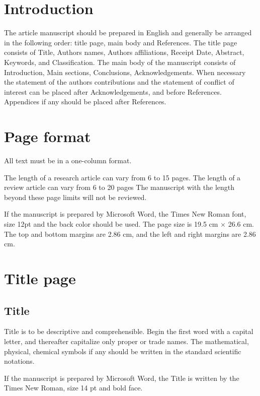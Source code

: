 \documentclass[a4,11pt]{cip-v3-cls-submit}
\begin{document}


\section{Introduction}

The article manuscript should be prepared in English and generally be arranged in the  following order:  title  page, main body and References.  The title page consists of Title, Authors names, Authors affiliations, Receipt Date, Abstract, Keywords, and Classification. The main body of the manuscript consists of Introduction, Main sections, Conclusions, Acknowledgements.
When necessary the statement of the authors contributions and the statement of conflict of interest can be placed after Acknowledgements, and before References. Appendices if any should be placed after References.


\section{Page format}

All text must be in a one-column format.

The length of a research article can vary from 6 to 15 pages.
The length of a review article can vary from 6 to 20 pages
The manuscript with the length beyond these page limits will not be reviewed.


If the manuscript is prepared by Microsoft Word, the Times New Roman font, size 12pt and the back color should be used. The page size is 19.5 cm $\times$ 26.6 cm. The top and bottom margins are 2.86 cm, and the left and right margins are 2.86 cm.



\section{Title page}

\subsection{Title}
Title is to be  descriptive and comprehensible. Begin the first word with a capital letter, and thereafter capitalize only proper or trade names. The mathematical, physical, chemical symbols if any should be written in the standard scientific notations.

If the manuscript is prepared by Microsoft Word, the Title is written by the Times New Roman, size 14 pt and bold face.
\end{document}

